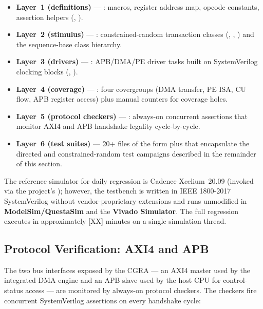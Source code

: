 \begin{itemize}[leftmargin=1.4cm,itemsep=2pt,topsep=2pt]
\item \textbf{Layer~1 (definitions)} --- : macros,
register address map, opcode constants, assertion helpers
(, ).
\item \textbf{Layer~2 (stimulus)} --- :
constrained-random transaction classes (,
, ) and the
sequence-base class hierarchy.
\item \textbf{Layer~3 (drivers)} --- :
APB/DMA/PE driver tasks built on SystemVerilog clocking blocks
(, ).
\item \textbf{Layer~4 (coverage)} --- : four
covergroups (DMA transfer, PE ISA, CU flow, APB register access)
plus manual counters for coverage holes.
\item \textbf{Layer~5 (protocol checkers)} ---
: always-on concurrent assertions
that monitor AXI4 and APB handshake legality cycle-by-cycle.
\item \textbf{Layer~6 (test suites)} --- 20+ files of the form
 plus  that
encapsulate the directed and constrained-random test campaigns
described in the remainder of this section.
\end{itemize}

The reference simulator for daily regression is Cadence Xcelium~20.09
(invoked via the project's ); however, the testbench
is written in IEEE 1800-2017 SystemVerilog without
vendor-proprietary extensions and runs unmodified in
\textbf{ModelSim/QuestaSim} and the \textbf{Vivado Simulator}. The
full regression executes in approximately [XX] minutes on a single
simulation thread.

\subsection{Protocol Verification: AXI4 and APB}
\label{ssec:protocol}

The two bus interfaces exposed by the CGRA --- an AXI4 master used
by the integrated DMA engine and an APB slave used by the host CPU
for control-status access --- are monitored by always-on protocol
checkers. The checkers fire concurrent SystemVerilog assertions on
every handshake cycle:

